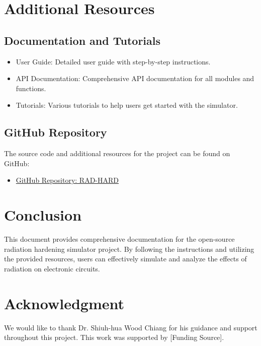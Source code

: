 \documentclass[12pt]{article}
\begin{document}
\section{Additional Resources}
\subsection{Documentation and Tutorials}
\begin{itemize}
    \item User Guide: Detailed user guide with step-by-step instructions.
    \item API Documentation: Comprehensive API documentation for all modules and functions.
    \item Tutorials: Various tutorials to help users get started with the simulator.
\end{itemize}

\subsection{GitHub Repository}
The source code and additional resources for the project can be found on GitHub:
\begin{itemize}
    \item \href{https://github.com/Jacoba1100254352/RAD-HARD}{GitHub Repository: RAD-HARD}
\end{itemize}

\section{Conclusion}
This document provides comprehensive documentation for the open-source radiation hardening simulator project. By following the instructions and utilizing the provided resources, users can effectively simulate and analyze the effects of radiation on electronic circuits.

\section*{Acknowledgment}
We would like to thank Dr. Shiuh-hua Wood Chiang for his guidance and support throughout this project. This work was supported by [Funding Source].
\end{document}
